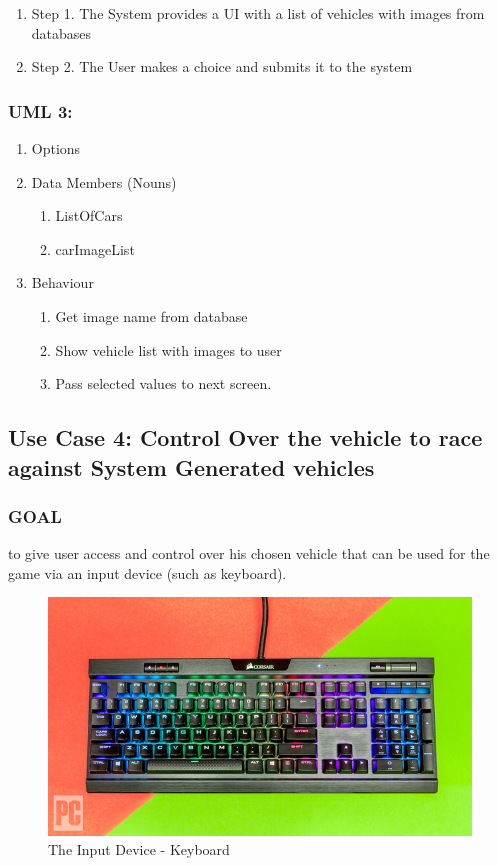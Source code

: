 \documentclass{article}
\begin{document}
\begin{enumerate}

    \item  Step 1. The System provides a UI with a list of vehicles with images from databases
    \item  Step 2. The User makes a choice and submits it to the system

\end{enumerate}

\subsubsection{UML 3:}
\begin{enumerate}
    \item Options
    \item Data Members (Nouns)
          \begin{enumerate}
              \item ListOfCars
              \item carImageList
              
          \end{enumerate}
    \item Behaviour
        \begin{enumerate}
            \item Get image name from database
            \item Show vehicle list with images to user
            \item Pass selected values to next screen.
        \end{enumerate}
\end{enumerate}

\subsection{Use Case 4: Control Over the vehicle to race against System Generated vehicles}

\subsubsection{GOAL}
to give user access and control over his chosen vehicle that can be used for the game via an input device (such as keyboard).

\begin{figure}[h!]
\centering
\includegraphics[scale=0.4]{keyboard}
\caption{The Input Device - Keyboard}
\label{fig:keyboard}
\end{figure}
\end{document}
